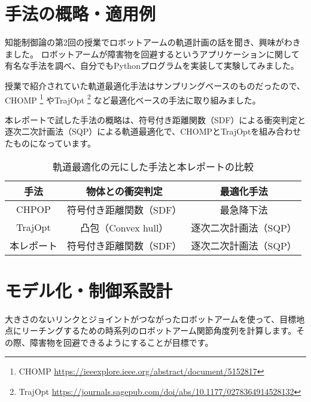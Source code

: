 
\section{手法の概略・適用例}

知能制御論の第2回の授業でロボットアームの軌道計画の話を聞き、興味がわきました。
ロボットアームが障害物を回避するというアプリケーションに関して有名な手法を調べ、自分でもPythonプログラムを実装して実験してみました。

授業で紹介されていた軌道最適化手法はサンプリングベースのものだったので、CHOMP
\footnote{CHOMP \url{https://ieeexplore.ieee.org/abstract/document/5152817}}
やTrajOpt
\footnote{TrajOpt \url{https://journals.sagepub.com/doi/abs/10.1177/0278364914528132}}
など最適化ベースの手法に取り組みました。

本レポートで試した手法の概略は、符号付き距離関数（SDF）による衝突判定と逐次二次計画法（SQP）による軌道最適化で、CHOMPとTrajOptを組み合わせたものになっています。

\begin{table}[htbp]
  \centering
  \begin{tabular}{c||c|c}
    手法 & 物体との衝突判定 & 最適化手法                         \\ \hline
    CHPOP      & 符号付き距離関数（SDF） & 最急降下法            \\
    TrajOpt    & 凸包（Convex hull）     & 逐次二次計画法（SQP） \\
    本レポート & 符号付き距離関数（SDF） & 逐次二次計画法（SQP） \\
  \end{tabular}
  \caption{軌道最適化の元にした手法と本レポートの比較}
  \label{table:compare}
\end{table}

\section{モデル化・制御系設計}
大きさのないリンクとジョイントがつながったロボットアームを使って、目標地点にリーチングするための時系列のロボットアーム関節角度列を計算します。その際、障害物を回避できるようにすることが目標です。

